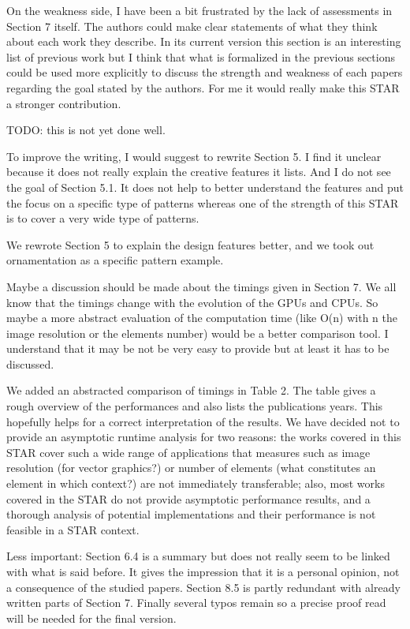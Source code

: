 \documentclass{egpubl}
\newcommand{\rev}[2]{{\color{greenrev}\textsuperscript{#1}#2}}
\renewcommand{\rev}[2]{{#2}}
\begin{document}
On the weakness side, I have been a bit frustrated by the lack of assessments in Section 7 itself. The authors could make clear statements of what they think about each work they describe. In its current version this section is an interesting list of previous work but I think that what is formalized in the previous sections could be used more explicitly to discuss the strength and weakness of each papers regarding the goal stated by the authors. 
For me it would really make this STAR a stronger contribution.

\rev{Comment}{\color{red}TODO: this is not yet done well.}


To improve the writing, I would suggest to rewrite Section 5. I find it unclear because it does not really explain the creative features it lists. And I do not see the goal of Section 5.1. It does not help to better understand the features and put the focus on a specific type of patterns whereas one of the strength of this STAR is to cover a very wide type of patterns. 

\rev{Comment}{We rewrote Section 5 to explain the design features better, and we took out ornamentation as a specific pattern example.}

Maybe a discussion should be made about the timings given in Section 7. We all know that the timings change with the evolution of the GPUs and CPUs. So maybe a more abstract evaluation of the computation time (like O(n) with n the image resolution or the elements number) would be a better comparison tool. I understand that it may be not be very easy to provide but at least it has to be discussed.

\rev{Comment}{We added an abstracted comparison of timings in Table 2. The table gives a rough overview of the performances and also lists the publications years. This hopefully helps for a correct interpretation of the results. We have decided not to provide an asymptotic runtime analysis for two reasons: the works covered in this STAR cover such a wide range of applications that measures such as image resolution (for vector graphics?) or number of elements (what constitutes an element in which context?) are not immediately transferable; also, most works covered in the STAR do not provide asymptotic performance results, and a thorough analysis of potential implementations and their performance is not feasible in a STAR context.}

Less important: Section 6.4 is a summary but does not really seem to be linked with what is said before. It gives the impression that it is a personal opinion, not a consequence of the studied papers. Section 8.5 is partly redundant with already written parts of Section 7.
Finally several typos remain so a precise proof read will be needed for the final version.
\end{document}
